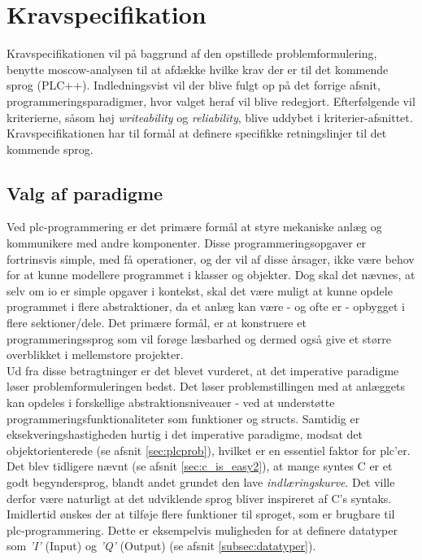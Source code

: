 \section{Kravspecifikation}
Kravspecifikationen vil på baggrund af den opstillede problemformulering, benytte \gls{moscow}-analysen til at afdække hvilke krav der er til det kommende sprog (PLC++). Indledningsvist vil der blive fulgt op på det forrige afsnit, programmeringsparadigmer, hvor valget heraf vil blive redegjort. Efterfølgende vil kriterierne, såsom høj \textit{writeability} og \textit{reliability}, blive uddybet i kriterier-afsnittet. Kravspecifikationen har til formål at definere specifikke retningslinjer til det kommende sprog.

\subsection{Valg af paradigme}\label{ssec:paradigmevalg}
Ved \gls{plc}-programmering er det primære formål at styre mekaniske anlæg og kommunikere med andre komponenter. Disse programmeringsopgaver er fortrinsvis simple, med få operationer, og der vil af disse årsager, ikke være behov for at kunne modellere programmet i klasser og objekter. Dog skal det nævnes, at selv om \gls{io} er simple opgaver i kontekst, skal det være muligt at kunne opdele programmet i flere abstraktioner, da et anlæg kan være - og ofte er - opbygget i flere sektioner/dele. Det primære formål, er at konstruere et programmeringssprog som vil forøge læsbarhed og dermed også give et større overblikket i mellemstore projekter. \\

\noindent Ud fra disse betragtninger er det blevet vurderet, at det imperative paradigme løser problemformuleringen bedst. Det løser problemstillingen med at anlæggets kan opdeles i forskellige abstraktionsniveauer - ved at understøtte programmeringsfunktionaliteter som funktioner og structs. Samtidig er eksekveringshastigheden hurtig i det imperative paradigme, modsat det objektorienterede (se afsnit \ref{sec:plcprob}), hvilket er en essentiel faktor for \gls{plc}'er. \\

\noindent Det blev tidligere nævnt (se afsnit \ref{sec:c_is_easy2}), at mange syntes C er et godt begyndersprog, blandt andet grundet den lave \textit{indlæringskurve}. Det ville derfor være naturligt at det udviklende sprog bliver inspireret af C's syntaks. Imidlertid ønskes der at tilføje flere funktioner til sproget, som er brugbare til \gls{plc}-programmering. Dette er eksempelvis muligheden for at definere datatyper som \textit{'I'} (Input) og \textit{'Q'} (Output) (se afsnit \ref{subsec:datatyper}). \\

